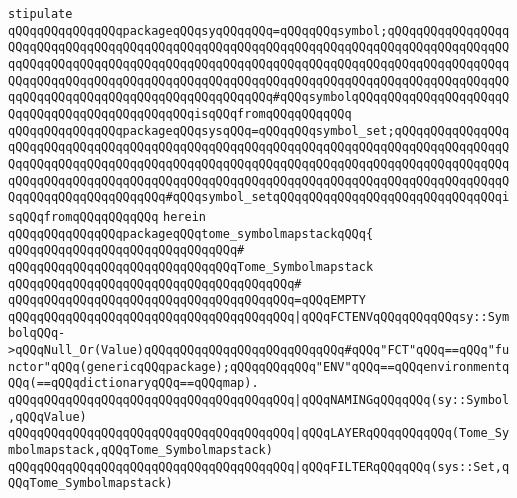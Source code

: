 \newline
\verb|stipulate|\newline
\verb|qQQqqQQqqQQqqQQqpackageqQQqsyqQQqqQQq=qQQqqQQqsymbol;qQQqqQQqqQQqqQQqqQQqqQQqqQQqqQQqqQQqqQQqqQQqqQQqqQQqqQQqqQQqqQQqqQQqqQQqqQQqqQQqqQQqqQQqqQQqqQQqqQQqqQQqqQQqqQQqqQQqqQQqqQQqqQQqqQQqqQQqqQQqqQQqqQQqqQQqqQQqqQQqqQQqqQQqqQQqqQQqqQQqqQQqqQQqqQQqqQQqqQQqqQQqqQQqqQQqqQQqqQQqqQQqqQQqqQQqqQQqqQQqqQQqqQQqqQQqqQQqqQQqqQQq#qQQqsymbolqQQqqQQqqQQqqQQqqQQqqQQqqQQqqQQqqQQqqQQqqQQqqQQqisqQQqfromqQQqqQQqqQQq|\newline
\verb|qQQqqQQqqQQqqQQqpackageqQQqsysqQQq=qQQqqQQqsymbol_set;qQQqqQQqqQQqqQQqqQQqqQQqqQQqqQQqqQQqqQQqqQQqqQQqqQQqqQQqqQQqqQQqqQQqqQQqqQQqqQQqqQQqqQQqqQQqqQQqqQQqqQQqqQQqqQQqqQQqqQQqqQQqqQQqqQQqqQQqqQQqqQQqqQQqqQQqqQQqqQQqqQQqqQQqqQQqqQQqqQQqqQQqqQQqqQQqqQQqqQQqqQQqqQQqqQQqqQQqqQQqqQQqqQQqqQQqqQQqqQQqqQQqqQQq#qQQqsymbol_setqQQqqQQqqQQqqQQqqQQqqQQqqQQqqQQqisqQQqfromqQQqqQQqqQQq|\newline
\verb|herein|\newline
\newline
\verb|qQQqqQQqqQQqqQQqpackageqQQqtome_symbolmapstackqQQq{|\newline
\verb|qQQqqQQqqQQqqQQqqQQqqQQqqQQqqQQq#|\newline
\verb|qQQqqQQqqQQqqQQqqQQqqQQqqQQqqQQqTome_Symbolmapstack|\newline
\verb|qQQqqQQqqQQqqQQqqQQqqQQqqQQqqQQqqQQqqQQq#|\newline
\verb|qQQqqQQqqQQqqQQqqQQqqQQqqQQqqQQqqQQqqQQq=qQQqEMPTY|\newline
\verb|qQQqqQQqqQQqqQQqqQQqqQQqqQQqqQQqqQQqqQQq|\verb#|qQQqFCTENVqQQqqQQqqQQqsy::SymbolqQQq->qQQqNull_Or(Value)qQQqqQQqqQQqqQQqqQQqqQQqqQQq#\verb|#qQQq"FCT"qQQq==qQQq"functor"qQQq(genericqQQqpackage);qQQqqQQqqQQq"ENV"qQQq==qQQqenvironmentqQQq(==qQQqdictionaryqQQq==qQQqmap).|\newline
\verb|qQQqqQQqqQQqqQQqqQQqqQQqqQQqqQQqqQQqqQQq|\verb#|qQQqNAMINGqQQqqQQq(sy::Symbol,qQQqValue)#\newline
\verb|qQQqqQQqqQQqqQQqqQQqqQQqqQQqqQQqqQQqqQQq|\verb#|qQQqLAYERqQQqqQQqqQQq(Tome_Symbolmapstack,qQQqTome_Symbolmapstack)#\newline
\verb|qQQqqQQqqQQqqQQqqQQqqQQqqQQqqQQqqQQqqQQq|\verb#|qQQqFILTERqQQqqQQq(sys::Set,qQQqTome_Symbolmapstack)#\newline

